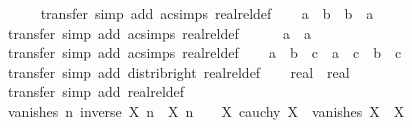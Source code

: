 \begin{isabellebody}
\ \ \ \ \isamarkupfalse%
\ transfer\ {\isacharparenleft}{\kern0pt}simp\ add{\isacharcolon}{\kern0pt}\ ac{\isacharunderscore}{\kern0pt}simps\ realrel{\isacharunderscore}{\kern0pt}def{\isacharparenright}{\kern0pt}\isanewline
\ \ \isamarkupfalse%
\ {\isachardoublequoteopen}a\ {\isacharasterisk}{\kern0pt}\ b\ {\isacharequal}{\kern0pt}\ b\ {\isacharasterisk}{\kern0pt}\ a{\isachardoublequoteclose}\isanewline
\ \ \ \ \isamarkupfalse%
\ transfer\ {\isacharparenleft}{\kern0pt}simp\ add{\isacharcolon}{\kern0pt}\ ac{\isacharunderscore}{\kern0pt}simps\ realrel{\isacharunderscore}{\kern0pt}def{\isacharparenright}{\kern0pt}\isanewline
\ \ \isamarkupfalse%
\ {\isachardoublequoteopen}{}\ {\isacharasterisk}{\kern0pt}\ a\ {\isacharequal}{\kern0pt}\ a{\isachardoublequoteclose}\isanewline
\ \ \ \ \isamarkupfalse%
\ transfer\ {\isacharparenleft}{\kern0pt}simp\ add{\isacharcolon}{\kern0pt}\ ac{\isacharunderscore}{\kern0pt}simps\ realrel{\isacharunderscore}{\kern0pt}def{\isacharparenright}{\kern0pt}\isanewline
\ \ \isamarkupfalse%
\ {\isachardoublequoteopen}{\isacharparenleft}{\kern0pt}a\ {\isacharplus}{\kern0pt}\ b{\isacharparenright}{\kern0pt}\ {\isacharasterisk}{\kern0pt}\ c\ {\isacharequal}{\kern0pt}\ a\ {\isacharasterisk}{\kern0pt}\ c\ {\isacharplus}{\kern0pt}\ b\ {\isacharasterisk}{\kern0pt}\ c{\isachardoublequoteclose}\isanewline
\ \ \ \ \isamarkupfalse%
\ transfer\ {\isacharparenleft}{\kern0pt}simp\ add{\isacharcolon}{\kern0pt}\ distrib{\isacharunderscore}{\kern0pt}right\ realrel{\isacharunderscore}{\kern0pt}def{\isacharparenright}{\kern0pt}\isanewline
\ \ \isamarkupfalse%
\ {\isachardoublequoteopen}{\isacharparenleft}{\kern0pt}{}{\isacharcolon}{\kern0pt}{\isacharcolon}{\kern0pt}real{\isacharparenright}{\kern0pt}\ {\isasymnoteq}\ {\isacharparenleft}{\kern0pt}{}{\isacharcolon}{\kern0pt}{\isacharcolon}{\kern0pt}real{\isacharparenright}{\kern0pt}{\isachardoublequoteclose}\isanewline
\ \ \ \ \isamarkupfalse%
\ transfer\ {\isacharparenleft}{\kern0pt}simp\ add{\isacharcolon}{\kern0pt}\ realrel{\isacharunderscore}{\kern0pt}def{\isacharparenright}{\kern0pt}\isanewline
\ \ \isamarkupfalse%
\ {\isachardoublequoteopen}vanishes\ {\isacharparenleft}{\kern0pt}{\isasymlambda}n{\isachardot}{\kern0pt}\ inverse\ {\isacharparenleft}{\kern0pt}X\ n{\isacharparenright}{\kern0pt}\ {\isacharasterisk}{\kern0pt}\ X\ n\ {\isacharminus}{\kern0pt}\ {}{\isacharparenright}{\kern0pt}{\isachardoublequoteclose}\ \ X{\isacharcolon}{\kern0pt}\ {\isachardoublequoteopen}cauchy\ X{\isachardoublequoteclose}\ {\isachardoublequoteopen}{\isasymnot}\ vanishes\ X{\isachardoublequoteclose}\ \ X\isanewline

\end{isabellebody}
